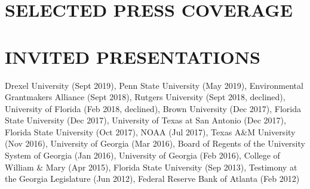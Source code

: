 \documentclass[letterpaper,11pt]{article}
\begin{document}
\section{SELECTED PRESS COVERAGE}


\section{INVITED PRESENTATIONS}
Drexel University (Sept 2019), Penn State University (May 2019), Environmental Grantmakers Alliance (Sept 2018), Rutgers University (Sept 2018, declined), University of Florida (Feb 2018, declined), Brown University (Dec 2017), Florida State University (Dec 2017), University of Texas at San Antonio (Dec 2017), Florida State University (Oct 2017), NOAA (Jul 2017), Texas A\&M University (Nov 2016), University of Georgia (Mar 2016), Board of Regents of the University System of Georgia (Jan 2016), University of Georgia (Feb 2016), College of William \& Mary (Apr 2015), Florida State University (Sep 2013), Testimony at the Georgia Legislature (Jun 2012), Federal Reserve Bank of Atlanta (Feb 2012)

% 
\end{document}
